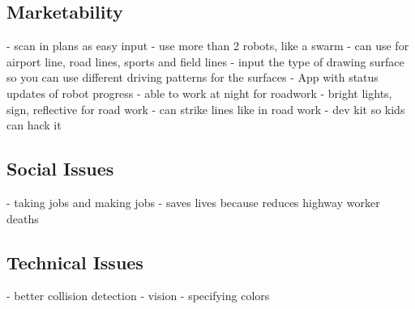 \subsection{Marketability}
- scan in plans as easy input
- use more than 2 robots, like a swarm
- can use for airport line, road lines, sports and field lines
- input the type of drawing surface so you can use different driving patterns for the surfaces
- App with status updates of robot progress
- able to work at night for roadwork
- bright lights, sign, reflective for road work
- can strike lines like in road work
- dev kit so kids can hack it

\subsection{Social Issues}
- taking jobs and making jobs
- saves lives because reduces highway worker deaths

\subsection{Technical Issues}
- better collision detection
- vision
- specifying colors

